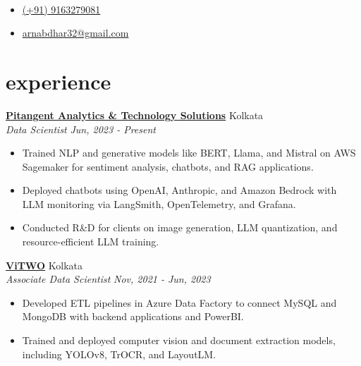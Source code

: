 \documentclass[12pt]{article}
\newcommand{\heading}[2]{\centering{\sffamily\Huge #1}\\\smallskip{\large{#2}}}
\newcommand{\entry}[4]{{{\textbf{#1}}} \hfill #3 \\ #2 \hfill #4}
\begin{document}
\begin{paracol}{2}

\heading{Arnab Dhar}
\switchcolumn

\begin{itemize}[itemsep=1pt,label={}]
  \item \href{https://wa.me/9163279081}{(+91) 9163279081}
  \item \href{mailto:arnabdhar32@gmail.com}{arnabdhar32@gmail.com}
\end{itemize}

\switchcolumn*



\section{experience}

\entry{\href{https://in.linkedin.com/company/pitangent}{Pitangent Analytics \& Technology Solutions}}{\emph{Data Scientist}}{Kolkata}{\emph{Jun, 2023 - Present}}
\begin{itemize}
    \item Trained NLP and generative models like BERT, Llama, and Mistral on AWS Sagemaker for sentiment analysis, chatbots, and RAG applications.
    \item Deployed chatbots using OpenAI, Anthropic, and Amazon Bedrock with LLM monitoring via LangSmith, OpenTelemetry, and Grafana.
    \item Conducted R\&D for clients on image generation, LLM quantization, and resource-efficient LLM training.
\end{itemize}


\medskip

\entry{\href{https://www.linkedin.com/company/vitwo}{ViTWO}}{\emph{Associate Data Scientist}}{Kolkata}{\emph{Nov, 2021 - Jun, 2023}}
\begin{itemize}
  \item Developed ETL pipelines in Azure Data Factory to connect MySQL and MongoDB with backend applications and PowerBI.
  \item Trained and deployed computer vision and document extraction models, including YOLOv8, TrOCR, and LayoutLM.
\end{itemize}




\end{paracol}
\end{document}

